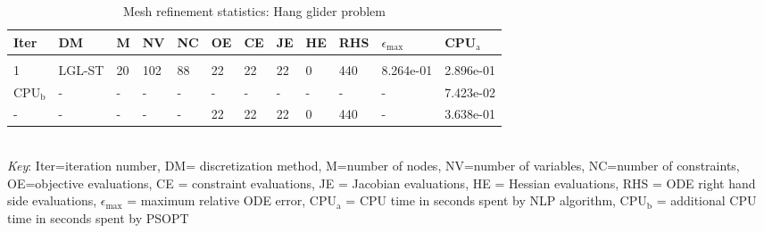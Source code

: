 
\begin{table}
\caption{Mesh refinement statistics: Hang glider problem}
\label{mesh_stats_hang_glider}
\renewcommand{\tabcolsep}{0.15cm}
\tiny
\begin{tabular}{llllllllllll}
Iter&DM&M&NV&NC&OE&CE&JE&HE&RHS&$\epsilon_{\max}$&CPU$_\mathrm{a}$ \\ \hline \\
1&LGL-ST&20&102&88&22&22&22&0&440&8.264e-01&2.896e-01\\
\hline
CPU$_\mathrm{b}$ &-&-&-&-&-&-&-&-&-&-&7.423e-02\\
-&-&-&-&-&22&22&22&0&440&-&3.638e-01\\
\end{tabular}
\newline \\ \emph{Key}: Iter=iteration number, DM= discretization method, M=number of nodes, NV=number of variables, NC=number of constraints, OE=objective evaluations,  	              CE = constraint evaluations, JE = Jacobian evaluations, HE = Hessian evaluations, RHS = ODE right hand side 		      evaluations, $\epsilon_{\max}$ = maximum relative ODE error, CPU$_\mathrm{a}$ = CPU time in seconds spent by NLP algorithm, 		      CPU$_\mathrm{b}$ = additional CPU time in seconds spent by PSOPT
\normalsize
\end{table}